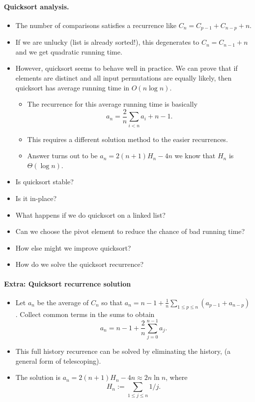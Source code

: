 \paragraph{Quicksort analysis.}
\begin{itemize}
\item The number of comparisons satisfies a recurrence like 
$C_n = C_{p-1} + C_{n - p} + n$.
\item If we are unlucky (list is already sorted!), this degenerates to 
$C_{n} = C_{n-1} + n$ and we get quadratic running time.
\item However, quicksort seems to behave well in practice. We can prove that 
if elements are distinct and all input permutations are equally likely, then 
quicksort has average running time in $O(n \log n)$.
\begin{itemize}
\item The recurrence for this average running time is basically
$$ a_n = \frac{2}{n} \sum_{i<n} a_i + n-1. $$ 
\item This requires a different solution method to the easier recurrences.
\item  Answer turns out to be $a_n = 2 (n + 1) H_n - 4n$ we know 
that $H_n$ is $\Theta(\log n)$.
\end{itemize}
\end{itemize}

\begin{itemize}
\item Is quicksort stable?
\item Is it in-place?
\item What happens if we do quicksort on a linked list?
\item Can we choose the pivot element to reduce the chance of bad running time?
\item How else might we improve quicksort?
\item How do we solve the quicksort recurrence?
\end{itemize}

\paragraph{Extra: Quicksort recurrence solution}
\begin{itemize}
\item Let $a_n$ be the average of $C_n$ so that 
$a_n = n - 1 + \frac{1}{n} \sum_{1\leq p \leq n} (a_{p-1} + a_{n-p})$. 
Collect common terms in the sums to obtain
$$a_n = n - 1 + \frac{2}{n} \sum_{j=0}^{n-1} a_j.$$ 
\item This {full history} recurrence can be solved by 
{eliminating the history}, (a general form of {telescoping}). 
\item The solution is 
$a_n = 2 (n + 1) H_n - 4n \approx 2 n \ln n$, where 
$$H_n:= \sum_{1\leq j \leq n} 1/j.$$ 
\end{itemize}

